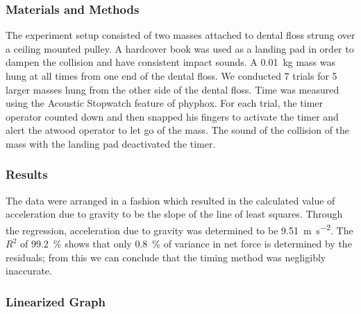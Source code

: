 \documentclass{beamer}
\begin{document}
\begin{frame}
    \frametitle{Materials and Methods}
    The experiment setup consisted of two masses attached to dental floss
    strung over a ceiling mounted pulley. A hardcover book was used as a
    landing pad in order to dampen the collision and have consistent impact
    sounds. A \qty{0.01}{\kg} mass was hung at all times from one end of the
    dental floss. We conducted 7 trials for 5 larger masses hung from the other
    side of the dental floss. Time was measured using the Acoustic Stopwatch
    feature of phyphox. For each trial, the timer operator counted down and
    then snapped his fingers to activate the timer and alert the atwood
    operator to let go of the mass. The sound of the collision of the mass
    with the landing pad deactivated the timer.
\end{frame}

\begin{frame} 
    \frametitle{Results} 
    The data were arranged in a fashion which resulted in the calculated value
    of acceleration due to gravity to be the slope of the line of least
    squares. Through the regression, acceleration due to gravity was determined
    to be \qty{9.51}{\meter\per\second\squared}. The $R^2$ of
    \qty{99.2}{\percent} shows that only \qty{0.8}{\percent} of variance in net
    force is determined by the residuals; from this we can conclude that the
    timing method was negligibly inaccurate.
\end{frame}

\begin{frame}
    \frametitle{Linearized Graph}
    \centering
\end{frame}
\end{document}
